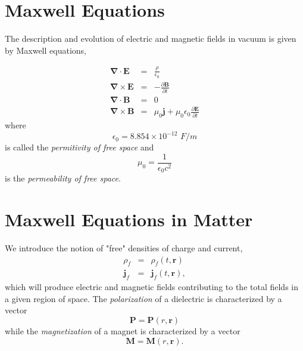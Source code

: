 \section{Maxwell Equations}

The description and evolution of  electric and magnetic fields in vacuum is given by Maxwell equations,

\begin{eqnarray}
\boldsymbol{\nabla} \cdot \textbf{E} &=& \frac{\rho}{\epsilon_0} \label{MaxwellEquations01}\\
\boldsymbol{\nabla} \times \textbf{E} &=& -\frac{\partial \textbf{B}}{\partial t} \label{MaxwellEquations02}\\
\boldsymbol{\nabla} \cdot \textbf{B} &=& 0 \label{MaxwellEquations03} \\
\boldsymbol{\nabla} \times \textbf{B} &=& \mu_0 \textbf{j} + \mu_0 \epsilon_0  \frac{\partial \textbf{E}}{\partial t} \label{MaxwellEquations04}
\end{eqnarray}
where 
\begin{equation}
\epsilon_0 = 8.854 \times 10^{-12} \textit{ F/m}
\end{equation}
is called the \textit{permitivity of free space} and 
\begin{equation}
\mu_0 = \frac{1}{\epsilon_0 c^2}
\end{equation}
is  the \textit{permeability of free space}.


\section{Maxwell Equations in Matter}

We introduce the notion of "free" densities of charge and current,
\begin{eqnarray}
\rho_f &=& \rho_f (t,\textbf{r})\\
\textbf{j}_f &=& \textbf{j}_f (t,\textbf{r}),
\end{eqnarray}
which will produce electric and magnetic fields contributing to the total fields in a given region of space. The \textit{polarization} of a dielectric is characterized by a vector
\begin{equation}
\textbf{P} = \textbf{P} (r,\textbf{r})
\end{equation}
while the \textit{magnetization} of a magnet is characterized by a vector
\begin{equation}
\textbf{M} = \textbf{M} (r,\textbf{r}).
\end{equation}

